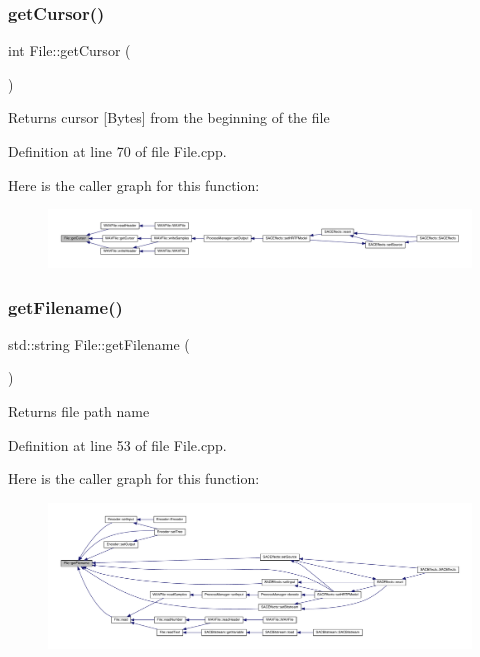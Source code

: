 \subsubsection{\texorpdfstring{get\+Cursor()}{getCursor()}}
{\footnotesize\ttfamily int File\+::get\+Cursor (\begin{DoxyParamCaption}{ }\end{DoxyParamCaption})}

\begin{DoxyReturn}{Returns}
cursor \mbox{[}Bytes\mbox{]} from the beginning of the file 
\end{DoxyReturn}


Definition at line 70 of file File.\+cpp.

Here is the caller graph for this function\+:
\nopagebreak
\begin{figure}[H]
\begin{center}
\leavevmode
\includegraphics[width=350pt]{class_file_a59701204411c5672fc35a95e31b002b3_icgraph}
\end{center}
\end{figure}
\mbox{\label{class_file_aff78fc9f04aecc0a56c151a5f328944a}} 
\subsubsection{\texorpdfstring{get\+Filename()}{getFilename()}}
{\footnotesize\ttfamily std\+::string File\+::get\+Filename (\begin{DoxyParamCaption}{ }\end{DoxyParamCaption})}

\begin{DoxyReturn}{Returns}
file path name 
\end{DoxyReturn}


Definition at line 53 of file File.\+cpp.

Here is the caller graph for this function\+:
\nopagebreak
\begin{figure}[H]
\begin{center}
\leavevmode
\includegraphics[width=350pt]{class_file_aff78fc9f04aecc0a56c151a5f328944a_icgraph}
\end{center}
\end{figure}
\mbox{\label{class_file_a917f13960e83613e5cb36d433b4cd833}} 
